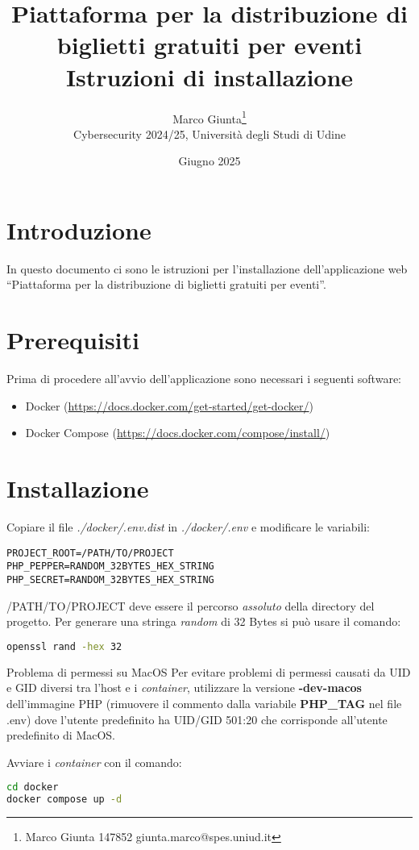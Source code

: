 \documentclass[italian,12pt,a4paper,oneside,final]{report}
\title{\Large Piattaforma per la distribuzione di\\biglietti gratuiti per eventi\\[0.5em]
	\large Istruzioni di installazione}
\date{Giugno 2025}
\author{
	Marco Giunta\thanks{Marco Giunta 147852 giunta.marco@spes.uniud.it}\\
	Cybersecurity 2024/25, Università degli Studi di Udine}
\begin{document}
\maketitle
	
\tableofcontents
\section{Introduzione}
In questo documento ci sono le istruzioni per l'installazione dell'applicazione web ``Piattaforma per la distribuzione di biglietti gratuiti per eventi''.

\section{Prerequisiti}
Prima di procedere all'avvio dell'applicazione sono necessari i seguenti software:

\begin{itemize}
	\item Docker  (\url{https://docs.docker.com/get-started/get-docker/})
	\item Docker Compose (\url{https://docs.docker.com/compose/install/})
\end{itemize}

\section{Installazione}
Copiare il file \emph{./docker/.env.dist} in \emph{./docker/.env} e modificare le variabili: \newline

\begin{lstlisting}
PROJECT_ROOT=/PATH/TO/PROJECT
PHP_PEPPER=RANDOM_32BYTES_HEX_STRING
PHP_SECRET=RANDOM_32BYTES_HEX_STRING
\end{lstlisting}
\hfill \break
\noindent \textsc{/PATH/TO/PROJECT} deve essere il percorso \emph{assoluto} della directory del progetto. \newpage
\noindent Per generare una stringa \textit{random} di 32 Bytes si può usare il comando:
\begin{lstlisting}[language=bash] 
openssl rand -hex 32
\end{lstlisting}

\begin{mytcolorbox}{Problema di permessi su MacOS}
Per evitare problemi di permessi causati da UID e GID diversi tra l'host e i \textit{container}, utilizzare la versione \textbf{-dev-macos} dell'immagine PHP (rimuovere il commento dalla variabile \textbf{PHP\_TAG} nel file .env) dove l'utente predefinito ha UID/GID 501:20 che corrisponde all'utente predefinito di MacOS.
\end{mytcolorbox}
\hfill \break
\noindent Avviare i \textit{container} con il comando:
\begin{lstlisting}[language=bash]
cd docker
docker compose up -d
\end{lstlisting}
\end{document}
